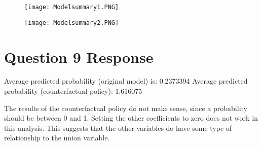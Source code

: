 \documentclass{article}
\begin{document}
\begin{figure}
    \centering
    \texttt{[image: Modelsummary1.PNG]}
\end{figure}
\begin{figure}
    \centering
    \texttt{[image: Modelsummary2.PNG]}
\end{figure}

\section{Question 9 Response}
Average predicted probability (original model) is: 0.2373394
Average predicted probability (counterfactual policy): 1.616075

The results of the counterfactual policy do not make sense, since a probability should be between 0 and 1. Setting the other coefficients to zero does not work in this analysis. This suggests that the other variables  do have some type of relationship to the union variable.
\end{document}

